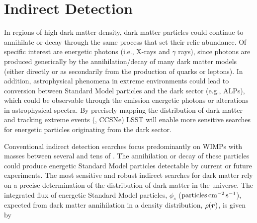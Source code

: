 \section{Indirect Detection }
  

In regions of high dark matter density, dark matter particles could continue to annihilate or decay through the same process that set their relic abundance.
Of specific interest are energetic photons (i.e., X-rays and $\gamma$ rays), since photons are produced generically by the annihilation/decay of many dark matter models (either directly or as secondarily from the production of quarks or leptons). In addition, astrophysical phenomena in extreme environments could lead to conversion between Standard Model particles and the dark sector (e.g., ALPs), which could be observable through the emission energetic photons or alterations in astrophysical spectra.
By precisely mapping the distribution of dark matter and tracking extreme events (\eg, CCSNe) LSST will enable more sensitive searches for energetic particles originating from the dark sector.

Conventional indirect detection searches focus predominantly on WIMPs with masses between several \GeV and tens of \TeV. 
The annihilation or decay of these particles could produce energetic Standard Model particles detectable by current or future experiments.
The most sensitive and robust indirect searches for dark matter rely on a precise determination of the distribution of dark matter in the universe.
The integrated flux of energetic Standard Model particles, $\phi_s$ (${\rm particles} \mathrm{\,cm}^{-2} \mathrm{\,s}^{-1}$), expected from dark matter annihilation in a density distribution, $\rho(\boldsymbol{r})$, is given by

